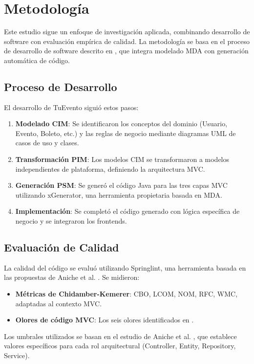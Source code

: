 \section{Metodología}

Este estudio sigue un enfoque de investigación aplicada, combinando desarrollo de software con evaluación empírica de calidad. La metodología se basa en el proceso de desarrollo de software descrito en \cite{paolone2020automatic}, que integra modelado MDA con generación automática de código.

\subsection{Proceso de Desarrollo}
El desarrollo de TuEvento siguió estos pasos:
\begin{enumerate}
\item \textbf{Modelado CIM}: Se identificaron los conceptos del dominio (Usuario, Evento, Boleto, etc.) y las reglas de negocio mediante diagramas UML de casos de uso y clases.
\item \textbf{Transformación PIM}: Los modelos CIM se transformaron a modelos independientes de plataforma, definiendo la arquitectura MVC.
\item \textbf{Generación PSM}: Se generó el código Java para las tres capas MVC utilizando xGenerator, una herramienta propietaria basada en MDA.
\item \textbf{Implementación}: Se completó el código generado con lógica específica de negocio y se integraron los frontends.
\end{enumerate}

\subsection{Evaluación de Calidad}
La calidad del código se evaluó utilizando Springlint, una herramienta basada en las propuestas de Aniche et al. \cite{aniche2016satt, aniche2018code}. Se midieron:
\begin{itemize}
\item \textbf{Métricas de Chidamber-Kemerer}: CBO, LCOM, NOM, RFC, WMC, adaptadas al contexto MVC.
\item \textbf{Olores de código MVC}: Los seis olores identificados en \cite{aniche2018code}.
\end{itemize}

Los umbrales utilizados se basan en el estudio de Aniche et al. \cite{aniche2016satt}, que establece valores específicos para cada rol arquitectural (Controller, Entity, Repository, Service).

